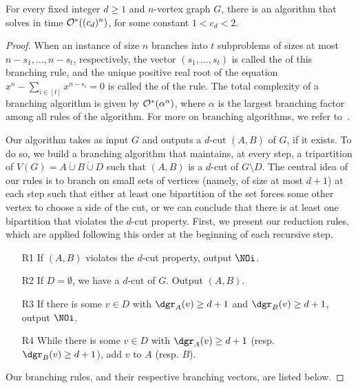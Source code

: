 \begin{theorem}
\label{thm:exact-algo}
    For every fixed integer $d \geq 1$ and $n$-vertex graph $G$, there is an algorithm that solves  in time $\mathcal{O}^*\!\left((c_d)^n\right)$, for some constant $1 < c_d < 2$.
\end{theorem}
\begin{proof}
    

When an instance of size $n$ branches into $t$ subproblems of sizes at most $n - s_1, \dots, n - s_t$, respectively, the vector $(s_1, \dots, s_t)$ is called the  of this branching rule, and the unique positive real root of the equation $x^n - \sum_{i \in [t]} x^{n - s_i} = 0$ is called the  of the rule.
The total complexity of a branching algorithm is given by $\mathcal{O}^*\!\left(\alpha^n\right)$, where $\alpha$ is the largest branching factor among all rules of the algorithm.
For more on branching algorithms, we refer to~\cite{exact_exponential_algorithms}.

\medskip

    Our algorithm takes as input $G$ and outputs a $d$-cut $(A, B)$ of $G$, if it exists.
    To do so, we build a branching algorithm that maintains, at every step, a tripartition of $V(G) = A \dot\cup B \dot\cup D$ such that $(A, B)$ is a $d$-cut of $G \setminus D$.
    The central idea of our rules is to branch on small  sets of vertices (namely, of size at most $d+1$) at each step such that either at least one bipartition of the set forces some other vertex to choose a side of the cut, or we can conclude that there is at least one bipartition that violates the $d$-cut property.
    First, we present our reduction rules, which are applied following this order at the beginning of each recursive step.

    \begin{itemize}
        \item[R1] If $(A, B)$ violates the $d$-cut property, output $\NOi$.
        \item[R2] If $D = \emptyset$, we have a $d$-cut of $G$. Output $(A,B)$.
        \item[R3] If there is some $v \in D$ with $\dgr_A(v) \geq d + 1$ and $\dgr_B(v) \geq d+1$, output $\NOi$.
        \item[R4] While there is some $v \in D$ with $\dgr_A(v) \geq d + 1$ (resp. $\dgr_B(v) \geq d+1$), add $v$ to $A$ (resp. $B$).
    \end{itemize}

    Our branching rules, and their respective branching vectors, are listed below.


\end{proof}
